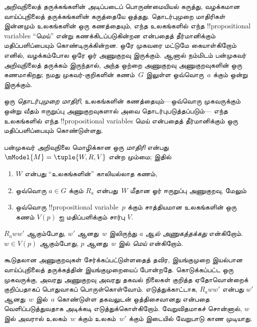 \documentclass[../../../include/open-logic-section]{subfiles}
\begin{document}


அறிவுநிலைத் தருக்கங்களின் அடிப்படைப் பொருண்மையியல் கருத்து, வழக்கமான
வாய்ப்புநிலைத் தருக்கங்களின் கருத்தையே ஒத்தது. தொடர்புமுறை மாதிரிகள் இன்னமும்
உலகங்களின் ஒரு கணத்தையும், எந்த உலகங்களில் எந்த !!{propositional variable}s
``மெய்'' என்று கணக்கிடப்படுகின்றன என்பதைத் தீர்மானிக்கும் மதிப்பளிப்பையும்
கொண்டிருக்கின்றன. ஒரே முகவரை மட்டுமே கையாள்கிறோம் எனில், வழக்கம்போல ஒரே ஓர்
அணுகுறவு இருக்கும். ஆனால் நம்மிடம் பன்முகவர் அறிவுநிலைத் தருக்கம் இருந்தால்,
அந்த ஒற்றை அணுகுறவு அணுகுறவுகளின் ஒரு கணமாகிறது; நமது முகவர்-குறிகளின்
கணம்~$G$ இலுள்ள ஒவ்வொரு~$a$ க்கும் ஒன்று இருக்கும்.

ஒரு \emph{தொடர்புமுறை மாதிரி}, உலகங்களின் கணத்தையும்---ஒவ்வொரு
முகவருக்கும் ஒன்று வீதம் ஈருறுப்பு அணுகுறவுகளால் அவை தொடர்புபடுத்தப்படும்---
எந்த உலகங்களில் எந்த !!{propositional variable}s மெய் என்பதைத் தீர்மானிக்கும்
ஒரு மதிப்பளிப்பையும் கொண்டுள்ளது.

\begin{defn}
  பன்முகவர் அறிவுநிலை மொழிக்கான ஒரு \emph{மாதிரி} என்பது
  $\mModel{M} = \tuple{W, R, V}$ என்ற மும்மை; இதில்
  \begin{enumerate}
  \item $W$ என்பது ``உலகங்களின்'' காலியல்லாத கணம்,
  \item ஒவ்வொரு $a \in G$ க்கும் ${R}_a$ என்பது~$W$ மீதான ஓர் ஈருறுப்பு
    அணுகுறவு, மேலும்
  \item ஒவ்வொரு !!{propositional variable}~$p$ க்கும் சாத்தியமான உலகங்களின்
    ஒரு கணம் $V(p)$ ஐ மதிப்பளிக்கும் சார்பு $V$.
  \end{enumerate}
  $R_a ww'$ ஆகும்போது, $w'$ ஆனது~$w$ இலிருந்து \emph{a ஆல்
  அணுகத்தக்கது} என்கிறோம். $w \in V(p)$ ஆகும்போது, $p$ ஆனது~$w$ இல்
  \emph{மெய்} என்கிறோம்.
\end{defn}

கூடுதலான அணுகுறவுகள் சேர்க்கப்பட்டுள்ளதைத் தவிர, இயங்குமுறை இயல்பான
வாய்ப்புநிலைத் தருக்கத்தின் இயங்குமுறையைப் போன்றதே. கொடுக்கப்பட்ட ஒரு
முகவருக்கு, அவரது அணுகுறவு அவரது தகவல் நிலைகள் குறித்த ஏதோவொன்றைக்
குறிப்பதாகப் பொதுவாகப் பொருள்கொள்வோம். எடுத்துக்காட்டாக, $R_a ww'$ என்பது
$w'$ ஆனது~$w$ இல்~$a$ கொண்டுள்ள தகவலுடன் ஒத்திசைவானது என்பதை
வெளிப்படுத்துவதாக அடிக்கடி எடுத்துக்கொள்கிறோம். வேறுவிதமாகச் சொன்னால்,
$w$ இல் அவரால் உலகம்~$w$ க்கும் உலகம்~$w'$ க்கும் இடையில் வேறுபாடு
காண முடியாது.
\end{document}
